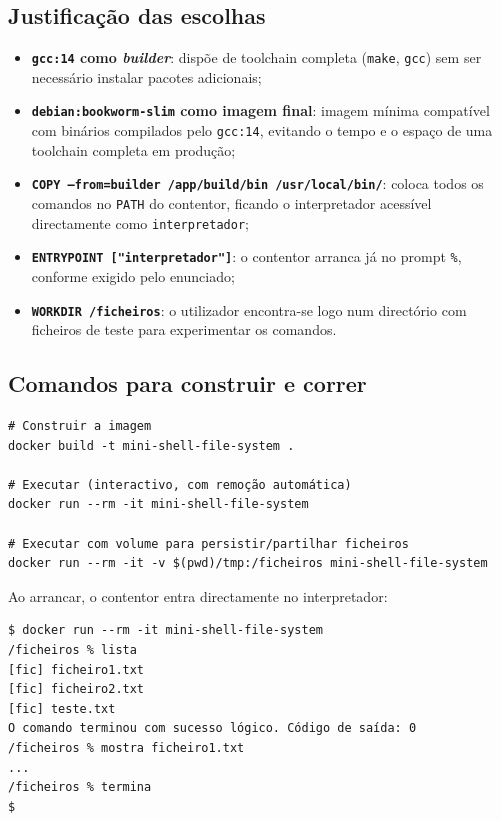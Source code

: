 \documentclass[11pt,a4paper]{article}
\begin{document}
\subsection{Justificação das escolhas}

\begin{itemize}[leftmargin=1.5em]
    \item \textbf{\texttt{gcc:14} como \textit{builder}}: dispõe de toolchain completa (\texttt{make}, \texttt{gcc}) sem ser necessário instalar pacotes adicionais;
    \item \textbf{\texttt{debian:bookworm-slim} como imagem final}: imagem mínima compatível com binários compilados pelo \texttt{gcc:14}, evitando o tempo e o espaço de uma toolchain completa em produção;
    \item \textbf{\texttt{COPY --from=builder /app/build/bin /usr/local/bin/}}: coloca todos os comandos no \texttt{PATH} do contentor, ficando o interpretador acessível directamente como \texttt{interpretador};
    \item \textbf{\texttt{ENTRYPOINT ["interpretador"]}}: o contentor arranca já no prompt \texttt{\%}, conforme exigido pelo enunciado;
    \item \textbf{\texttt{WORKDIR /ficheiros}}: o utilizador encontra-se logo num directório com ficheiros de teste para experimentar os comandos.
\end{itemize}

\subsection{Comandos para construir e correr}

\begin{lstlisting}[style=shellstyle]
# Construir a imagem
docker build -t mini-shell-file-system .

# Executar (interactivo, com remoção automática)
docker run --rm -it mini-shell-file-system

# Executar com volume para persistir/partilhar ficheiros
docker run --rm -it -v $(pwd)/tmp:/ficheiros mini-shell-file-system
\end{lstlisting}

Ao arrancar, o contentor entra directamente no interpretador:

\begin{lstlisting}[style=shellstyle]
$ docker run --rm -it mini-shell-file-system
/ficheiros % lista
[fic] ficheiro1.txt
[fic] ficheiro2.txt
[fic] teste.txt
O comando terminou com sucesso lógico. Código de saída: 0
/ficheiros % mostra ficheiro1.txt
...
/ficheiros % termina
$
\end{lstlisting}
\end{document}
